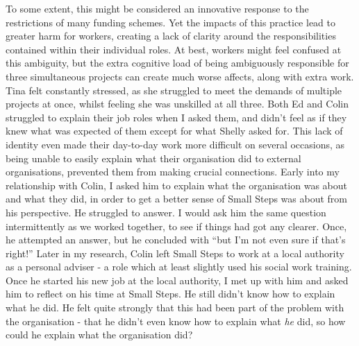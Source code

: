 To some extent, this might be considered an innovative response to the restrictions of many funding schemes. Yet the impacts of this practice lead to greater harm for workers, creating a lack of clarity around the responsibilities contained within their individual roles. At best, workers might feel confused at this ambiguity, but the extra cognitive load of being ambiguously responsible for three simultaneous projects can create much worse affects, along with extra work. Tina felt constantly stressed, as she struggled to meet the demands of multiple projects at once, whilst feeling she was unskilled at all three. Both Ed and Colin struggled to explain their job roles when I asked them, and didn't feel as if they knew what was expected of them except for what Shelly asked for. This lack of identity even made their day-to-day work more difficult on several occasions, as being unable to easily explain what their organisation did to external organisations, prevented them from making crucial connections. Early into my relationship with Colin, I asked him to explain what the organisation was about and what they did, in order to get a better sense of  Small Steps was about from his perspective. He struggled to answer. I would ask him the same question intermittently as we worked together, to see if things had got any clearer. Once, he attempted an answer, but he concluded with “but I’m not even sure if that’s right!” Later in my research, Colin left Small Steps to work at a local authority as a personal adviser - a role which at least slightly used his social work training. Once he started his new job at the local authority, I met up with him and asked him to reflect on his time at Small Steps. He still didn't know how to explain what he did. He felt quite strongly that this had been part of the problem with the organisation - that he didn't even know how to explain what \emph{he} did, so how could he explain what the organisation did? 


